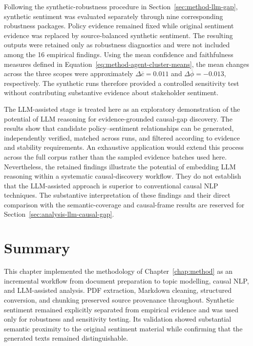 Following the synthetic-robustness procedure in Section~\ref{sec:method-llm-gap},
synthetic sentiment was evaluated separately through nine corresponding robustness
packages. Policy evidence remained fixed while original sentiment evidence was
replaced by source-balanced synthetic sentiment. The resulting outputs were retained
only as robustness diagnostics and were not included among the 16 empirical findings.
Using the mean confidence and faithfulness measures defined in
Equation~\ref{eq:method-agent-cluster-means}, the mean changes across the three
scopes were approximately \(\Delta\overline{c}=0.011\) and
\(\Delta\overline{\phi}=-0.013\), respectively. The synthetic runs therefore provided
a controlled sensitivity test without contributing substantive evidence about
stakeholder sentiment.

The LLM-assisted stage is treated here as an exploratory demonstration of the
potential of LLM reasoning for evidence-grounded causal-gap discovery. The results
show that candidate policy--sentiment relationships can be generated, independently
verified, matched across runs, and filtered according to evidence and stability
requirements. An exhaustive application would extend this process across the full
corpus rather than the sampled evidence batches used here. Nevertheless, the retained
findings illustrate the potential of embedding LLM reasoning within a systematic
causal-discovery workflow. They do not establish that the LLM-assisted approach is
superior to conventional causal NLP techniques. The substantive interpretation of
these findings and their direct comparison with the semantic-coverage and
causal-frame results are reserved for Section~\ref{sec:analysis-llm-causal-gap}.

\section*{Summary}

This chapter implemented the methodology of Chapter~\ref{chap:method} as an
incremental workflow from document preparation to topic modelling, causal NLP, and
LLM-assisted analysis. PDF extraction, Markdown cleaning, structured conversion, and
chunking preserved source provenance throughout. Synthetic sentiment remained
explicitly separated from empirical evidence and was used only for robustness and
sensitivity testing. Its validation showed substantial semantic proximity to the
original sentiment material while confirming that the generated texts remained
distinguishable.

